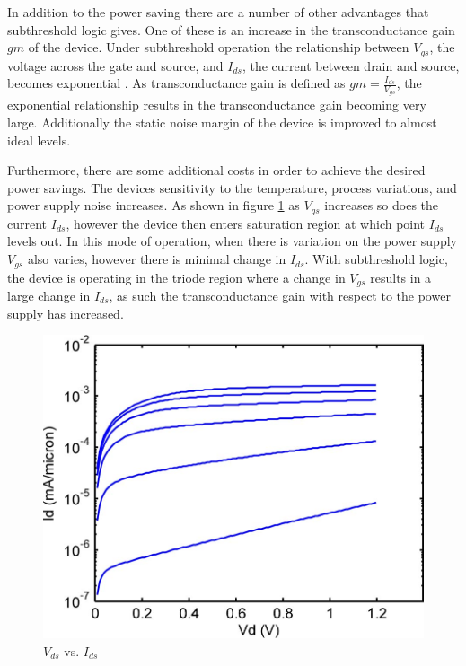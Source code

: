 In addition to the power saving there are a number of other advantages that subthreshold logic gives.
One of these is an increase in the transconductance gain $gm$ of the device.
Under subthreshold operation the relationship between $V_{gs}$, the voltage across the gate and source, and $I_{ds}$, the current between drain and source, becomes exponential \cite{ULPSubThresh}.
As transconductance gain is defined as $gm = \frac{I_{ds}}{V_{gs}}$, the exponential relationship results in the transconductance gain becoming very large.
Additionally the static noise margin of the device is improved to almost ideal levels.

Furthermore, there are some additional costs in order to achieve the desired power savings.
The devices sensitivity to the temperature, process variations, and power supply noise increases.
As shown in figure \ref{fig:VgsIds} as $V_{gs}$ increases so does the current $I_{ds}$, however the device then enters saturation region at which point $I_{ds}$ levels out.
In this mode of operation, when there is variation on the power supply $V_{gs}$ also varies, however there is minimal change in $I_{ds}$.
With subthreshold logic, the device is operating in the triode region where a change in $V_{gs}$ results in a large change in $I_{ds}$, as such the transconductance gain with respect to the power supply has increased.

\begin{figure}
	\centering
	\includegraphics[width=\columnwidth]{../../images/vgsvsids.png}
	\caption{$V_{ds}$ vs. $I_{ds}$ \cite{SemiEmpiricalModels}}
	\label{fig:VgsIds}
\end{figure}

